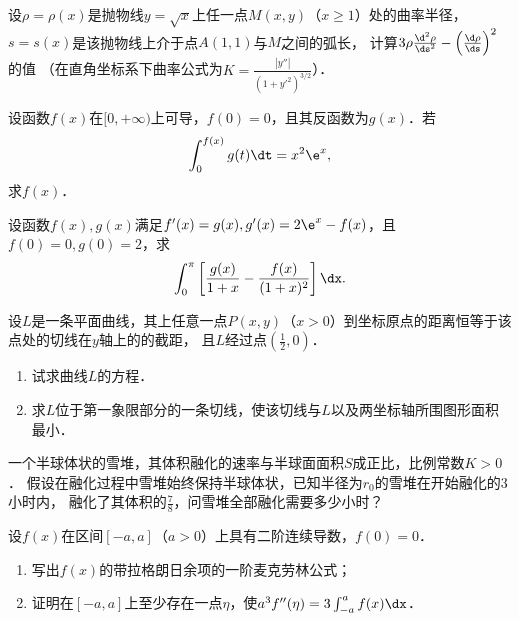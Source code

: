 \documentclass[plain,noanswer,medmath]{../../template/jnuexam}
\begin{document}

\begin{problem}
设$\rho = \rho(x)$是抛物线$y = \sqrt{x}$上任一点$M(x,y)$（$x \ge 1$）处的曲率半径，
$s = s(x)$是该抛物线上介于点$A(1,1)$与$M$之间的弧长，
计算$3\rho \frac{\d^2\rho}{\ds^2} - \left(\frac{\d\rho}{\ds} \right)^2$的值%
（在直角坐标系下曲率公式为$K = \frac{\left| y'' \right|}{(1 + y'^2)^{3/2}}$）．
\end{problem}



\begin{problem}
设函数$f(x)$在$[0, +\infty)$上可导，$f(0) = 0$，且其反函数为$g(x)$．若
$$\int_0^{f(x)} g(t)\dt = x^2\e^x,$$
求$f(x)$．
\end{problem}



\begin{problem}
设函数$f(x),g(x)$满足$f'(x) = g(x),g'(x) = 2\e^x - f(x)$，且$f(0) = 0,g(0) = 2$，求
$$\int_0^{\pi}\left[\frac{g(x)}{1 + x} - \frac{f(x)}{(1 + x)^2} \right] \dx.$$
\end{problem}



\begin{problem}
设$L$是一条平面曲线，其上任意一点$P(x,y)$（$x > 0$）到坐标原点的距离恒等于该点处的切线在$y$轴上的的截距，
且$L$经过点$\left(\frac{1}{2},0 \right)$．
\begin{enumerate}
\item 试求曲线$L$的方程．
\item 求$L$位于第一象限部分的一条切线，使该切线与$L$以及两坐标轴所围图形面积最小．
\end{enumerate}
\end{problem}



\begin{problem}
一个半球体状的雪堆，其体积融化的速率与半球面面积$S$成正比，比例常数$K > 0$．
假设在融化过程中雪堆始终保持半球体状，已知半径为$r_0$的雪堆在开始融化的$3$小时内，
融化了其体积的$\frac{7}{8}$，问雪堆全部融化需要多少小时？
\end{problem}



\begin{problem}
设$f(x)$在区间$[- a,a]$（$a > 0$）上具有二阶连续导数，$f(0) = 0$．
\begin{enumerate}
\item 写出$f(x)$的带拉格朗日余项的一阶麦克劳林公式；
\item 证明在$[- a,a]$上至少存在一点$\eta$，使$a^3 f''(\eta) = 3\int_{- a}^a f(x)\dx$．
\end{enumerate}
\end{problem}
\end{document}
